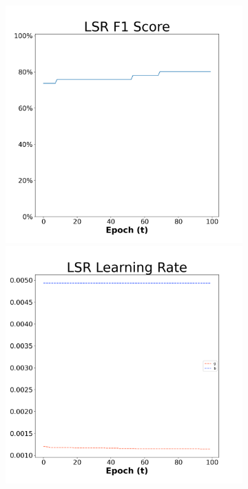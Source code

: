 \begin{figure}[H]
    \centering %
\begin{subfigure}{0.3\textwidth}
  \includegraphics[width=\linewidth]{images/exper2/Ionosphere/LSR_0.01_f1.png}
    \includegraphics[width=\linewidth]{images/exper2/Ionosphere/LSR_0.01_lr.png}

\end{subfigure}
\end{figure}
